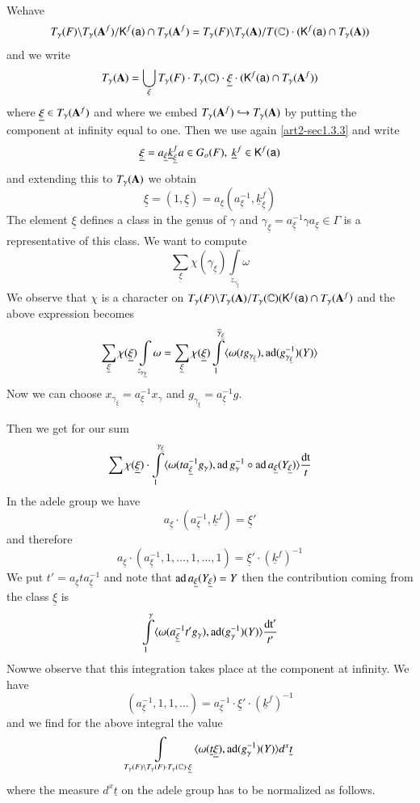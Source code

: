We\pageoriginale have
$$
T_{\gamma}(F)\backslash T_{\gamma}(\mathbf{A}^{f})/\mathsf{K}^{f}(\mathsf{a})\cap T_{\gamma}(\mathbf{A}^{f})=T_{\gamma}(F)\backslash T_{\gamma}(\mathbf{A})/T(\mathbb{C})\cdot (\mathsf{K}^{f}(\mathsf{a})\cap T_{\gamma}(\mathbf{A}))
$$
and we write
$$
T_{\gamma}(\mathbf{A})=\bigcup\limits_{\xi}T_{\gamma}(F)\cdot T_{\gamma}(\mathbb{C})\cdot \underline{\xi}\cdot (\mathsf{K}^{f}(\mathsf{a})\cap T_{\gamma}(\mathbf{A}^{f}))
$$
where $\underline{\xi}\in T_{\gamma}(\mathbf{A}^{f})$ and where we embed $T_{\gamma}(\mathbf{A}^{f})\hookrightarrow T_{\gamma}(\mathbf{A})$ by putting the component at infinity equal to one. Then we use again \ref{art2-sec1.3.3} and write
$$
\underline{\xi}=a_{\underline{\xi}}\underline{k}^{f}_{\underline{\xi}} a\in G_{o}(F), \ \underline{k}^{f}\in \mathsf{K}^{f}(\mathsf{a})
$$
and extending this to $T_{\gamma}(\mathbf{A})$ we obtain
$$
\underline{\xi}=(1,\underline{\xi})=a_{\underline{\xi}}(a^{-1}_{\underline{\xi}},\underline{k}^{f}_{\underline{\xi}})
$$
The element $\underline{\xi}$ defines a class in the genus of $\gamma$ and $\gamma_{\underline{\xi}}=a^{-1}_{\underline{\xi}}\gamma a_{\underline{\xi}}\in \Gamma$ is a representative of this class. We want to compute
$$
\sum\limits_{\underline{\xi}}\chi(\gamma_{\underline{\xi}})\int\limits_{z_{\gamma_{\underline{\xi}}}}\omega
$$
We observe that $\chi$ is a character on $T_{\gamma}(F)\backslash T_{\gamma}(\mathbf{A})/T_{\gamma}(\mathbb{C})(\mathsf{K}^{f}(\mathsf{a})\cap T_{\gamma}(\mathbf{A}^{f})$ and the above expression becomes
$$
\sum\limits_{\underline{\xi}}\chi(\underline{\xi})\int\limits_{z_{\gamma_{\underline{\gamma}}}}\omega=\sum\limits_{\underline{\xi}}\chi(\underline{\xi})\int\limits^{\overline{\gamma}_{\underline{\xi}}}_{1}\langle \omega(tg_{\gamma_{\underline{\xi}}}), \operatorname{ad}(g^{-1}_{\gamma_{\underline{\xi}}})(Y)\rangle
$$
Now we can choose $x_{\gamma_{\underline{\xi}}}=a^{-1}_{\underline{\xi}}x_{\gamma}$ and $g_{\gamma_{\underline{\xi}}}=a^{-1}_{\underline{\xi}}g$.

Then we get for our sum
$$
\sum \chi(\underline{\xi})\cdot \int\limits^{\gamma_{\underline{\xi}}}_{1}\langle \omega(ta^{-1}_{\underline{\xi}}g_{\gamma}), \operatorname{ad} g^{-1}_{\gamma}\circ \operatorname{ad} a_{\underline{\xi}}(Y_{\underline{\xi}})\rangle \dfrac{\operatorname{dt}}{t}
$$
In the adele group we have
$$
a_{\underline{\xi}}\cdot (a^{-1}_{\underline{\xi}},\underline{k}^{f})=\underline{\xi}'
$$
and therefore
$$
a_{\underline{\xi}}\cdot (a^{-1}_{\underline{\xi}},1,\ldots,1,\ldots,1)=\underline{\xi}'\cdot (\underline{k}^{f})^{-1}
$$
We put $t'=a_{\underline{\xi}}ta^{-1}_{\underline{\xi}}$ and note that $\operatorname{ad} a_{\underline{\xi}}(Y_{\underline{\xi}})=Y$ then the contribution coming from the class $\underline{\xi}$ is
$$
\int\limits^{\gamma}_{1}\langle \omega(a^{-1}_{\underline{\xi}}t'g_{\gamma}),\operatorname{ad}(g^{-1}_{\gamma})(Y)\rangle \dfrac{\operatorname{dt}'}{t'}
$$
\eject
\noindent
Now\pageoriginale we observe that this integration takes place at the component at infinity. We have
$$
(a^{-1}_{\underline{\xi}},1,1,\ldots)=a^{-1}_{\underline{\xi}}\cdot \underline{\xi}'\cdot (\underline{k}^{f})^{-1}
$$
and we find for the above integral the value
$$
\int\limits_{T_{\gamma}(F)\backslash T_{\gamma}(F)\cdot T_{\gamma}(\mathbb{C})\cdot \underline{\xi}}\langle \omega(\underline{t}\underline{\xi}),\operatorname{ad} (g^{-1}_{\gamma})(Y)\rangle d^{x}\underline{t}
$$
where the measure $d^{x}\underline{t}$ on the adele group has to be normalized as follows.

